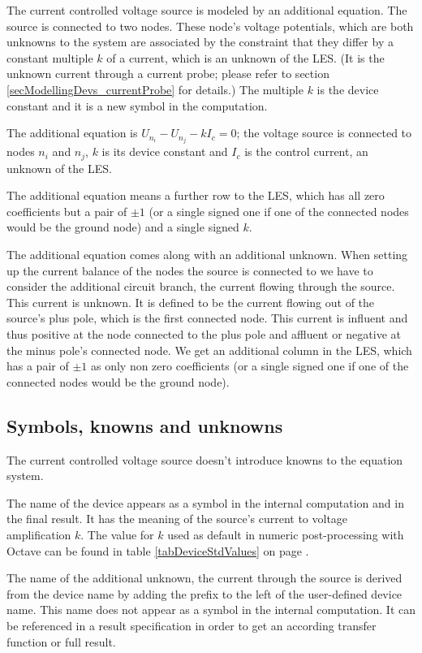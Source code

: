 The current controlled voltage source is modeled by an additional
equation. The source is connected to two nodes. These node's voltage
potentials, which are both unknowns to the system are associated by the
constraint that they differ by a constant multiple $k$ of a current, which
is an unknown of the LES. (It is the unknown current through a current
probe; please refer to section \ref{secModellingDevs_currentProbe} for
details.) The multiple $k$ is the device constant and it is a new symbol
in the computation.

The additional equation is $U_{n_i} - U_{n_j} - k I_c = 0$;
the voltage source is connected to nodes $n_i$ and $n_j$, $k$ is its
device constant and $I_c$ is the control current, an unknown of the LES.

The additional equation means a further row to the LES, which has all zero
coefficients but a pair of $\pm 1$ (or a single signed one if one of the
connected nodes would be the ground node) and a single signed $k$.

The additional equation comes along with an additional unknown. When
setting up the current balance of the nodes the source is connected to we
have to consider the additional circuit branch, the current flowing
through the source. This current is unknown. It is defined to be the
current flowing out of the source's plus pole, which is the first
connected node. This current is influent and thus positive at the node
connected to the plus pole and affluent or negative at the minus pole's
connected node. We get an additional column in the LES, which has a pair
of $\pm 1$ as only non zero coefficients (or a single signed one if one of
the connected nodes would be the ground node).


\subsection{Symbols, knowns and unknowns}

The current controlled voltage source doesn't introduce knowns to the
equation system.

The name of the device appears as a symbol in the internal computation and
in the final result. It has the meaning of the source's current to voltage
amplification $k$. The value for $k$ used as default in numeric
post-processing with Octave can be found in table \ref{tabDeviceStdValues}
on page \pageref{tabDeviceStdValues}.

The name of the additional unknown, the current through the source is
derived from the device name by adding the prefix  to the left
of the user-defined device name. This name does not appear as a symbol in
the internal computation. It can be referenced in a result specification
in order to get an according transfer function or full result.


